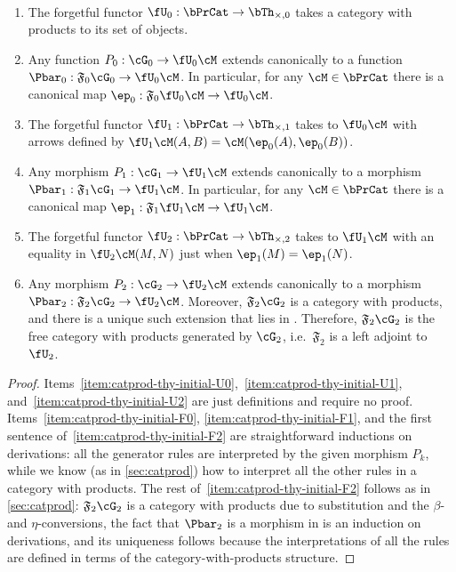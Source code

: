 \documentclass{book}
\newcommand{\F}[1]{\mathfrak{F}_{#1}}
\def\timesthy#1{\bTh_{\times,#1}}
\begin{document}
\begin{defnthm}\label{thm:catprod-thy-initial}\ 
  \begin{enumerate}
  \item The forgetful functor $\fU_0 : \bPrCat \to \timesthy0$ takes a category with products to its set of objects.\label{item:catprod-thy-initial-U0}
  \item Any function $P_0:\cG_0 \to \fU_0\cM$ extends canonically to a function $\Pbar_0:\F{0}\cG_0\to \fU_0\cM$.
    In particular, for any $\cM\in\bPrCat$ there is a canonical map $\ep_0:\F{0}\fU_0\cM\to \fU_0\cM$.\label{item:catprod-thy-initial-F0}
  \item The forgetful functor $\fU_1 : \bPrCat \to \timesthy1$ takes \cM to $\fU_0\cM$ with arrows defined by $\fU_1\cM(A,B) = \cM(\ep_0(A),\ep_0(B))$.\label{item:catprod-thy-initial-U1}
  \item Any morphism $P_1:\cG_1 \to \fU_1\cM$ extends canonically to a morphism $\Pbar_1 : \F{1}\cG_1 \to \fU_1\cM$.
    In particular, for any $\cM\in\bPrCat$ there is a canonical map $\ep_1:\F{1}\fU_1\cM\to \fU_1\cM$.\label{item:catprod-thy-initial-F1}
  \item The forgetful functor $\fU_2 : \bPrCat \to \timesthy2$ takes \cM to $\fU_1\cM$ with an equality in $\fU_2\cM(M,N)$ just when $\ep_1(M)=\ep_1(N)$.\label{item:catprod-thy-initial-U2}
  \item Any morphism $P_2:\cG_2 \to \fU_2\cM$ extends canonically to a morphism $\Pbar_2 : \F{2}\cG_2 \to \fU_2\cM$.
    Moreover, $\F{2}\cG_2$ is a category with products, and there is a unique such extension that lies in \bPrCat.
    Therefore, $\F{2}\cG_2$ is the free category with products generated by $\cG_2$, i.e.\ $\F{2}$ is a left adjoint to $\fU_2$.\label{item:catprod-thy-initial-F2}
  \end{enumerate}
\end{defnthm}
\begin{proof}
  Items~\ref{item:catprod-thy-initial-U0},~\ref{item:catprod-thy-initial-U1}, and~\ref{item:catprod-thy-initial-U2} are just definitions and require no proof.
  Items~\ref{item:catprod-thy-initial-F0}, \ref{item:catprod-thy-initial-F1}, and the first sentence of~\ref{item:catprod-thy-initial-F2} are straightforward inductions on derivations: all the generator rules are interpreted by the given morphism $P_k$, while we know (as in \cref{sec:catprod}) how to interpret all the other rules in a category with products.
  The rest of~\ref{item:catprod-thy-initial-F2} follows as in \cref{sec:catprod}: $\F{2}\cG_2$ is a category with products due to substitution and the $\beta$- and $\eta$-conversions, the fact that $\Pbar_2$ is a morphism in \bPrCat is an induction on derivations, and its uniqueness follows because the interpretations of all the rules are defined in terms of the category-with-products structure.
\end{proof}
\end{document}
